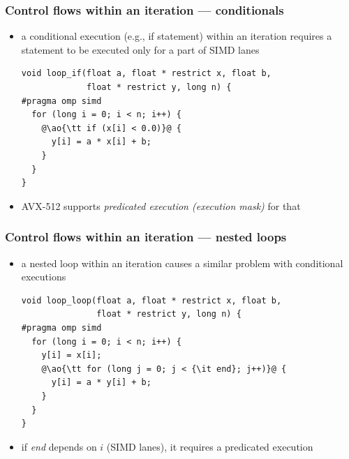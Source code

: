 \documentclass[12pt,dvipdfmx]{beamer}
\newcommand{\ao}[1]{{\color{blue}#1}}
\begin{document}
\begin{frame}[fragile]
  \frametitle{Control flows within an iteration --- conditionals}
  \begin{itemize}
  \item a conditional execution (e.g., if statement) within an iteration
    requires a statement to be executed only for a part of SIMD lanes
\begin{lstlisting}
void loop_if(float a, float * restrict x, float b,
             float * restrict y, long n) {
#pragma omp simd
  for (long i = 0; i < n; i++) {
    @\ao{\tt if (x[i] < 0.0)}@ {
      y[i] = a * x[i] + b;
    }
  }
}
\end{lstlisting}
\item AVX-512 supports
  \ao{\it predicated execution (execution mask)} for that
\end{itemize}
\end{frame}

\begin{frame}[fragile]
  \frametitle{Control flows within an iteration --- nested loops}
  \begin{itemize}
  \item a nested loop within an iteration causes a similar problem with
    conditional executions
\begin{lstlisting}
void loop_loop(float a, float * restrict x, float b,
               float * restrict y, long n) {
#pragma omp simd
  for (long i = 0; i < n; i++) {
    y[i] = x[i];
    @\ao{\tt for (long j = 0; j < {\it end}; j++)}@ {
      y[i] = a * y[i] + b;
    }
  }
}
\end{lstlisting}
\item if {\it end} depends on $i$ (SIMD lanes), it requires
  a predicated execution
\end{itemize}
\end{frame}
\end{document}
